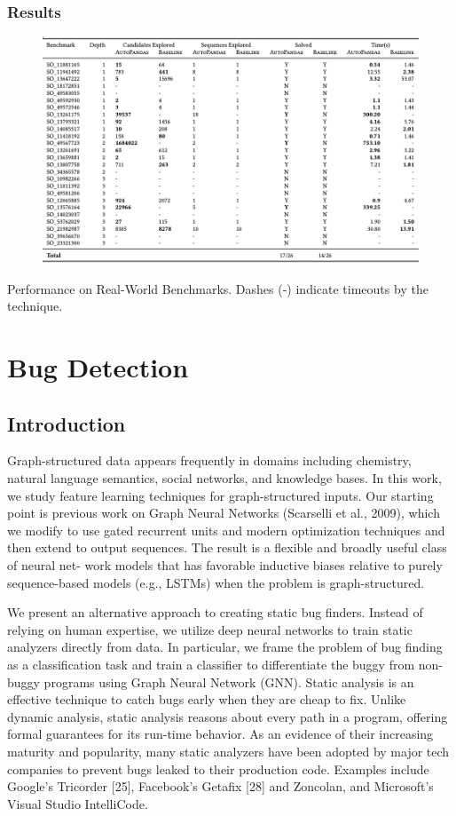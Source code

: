 \documentclass{article}
\begin{document}
\subsubsection{Results}
\begin{figure}[ht]
\vskip 0.2in
\begin{center}
\centerline{\includegraphics[width=\columnwidth]{Images/Synthesis3-3.png}}
\label{icml-historical}
\end{center}
\vskip -0.2in
\end{figure}
Performance on Real-World Benchmarks. Dashes (-) indicate timeouts by the technique.

\section{Bug Detection}
\subsection{Introduction}
Graph-structured data appears frequently in domains including chemistry, natural language semantics, social networks, and knowledge bases. In this work, we study feature learning techniques for graph-structured inputs. Our starting point is previous work on Graph Neural Networks (Scarselli et al., 2009), which we modify to use gated recurrent units and modern optimization techniques and then extend to output sequences. The result is a flexible and broadly useful class of neural net- work models that has favorable inductive biases relative to purely sequence-based models (e.g., LSTMs) when the problem is graph-structured.

We present an alternative approach to creating static bug finders. Instead of relying on human expertise, we utilize deep neural networks to train static analyzers directly from data. In particular, we frame the problem of bug finding as a classification task and train a classifier to differentiate the buggy from non-buggy programs using Graph Neural Network (GNN). Static analysis is an effective technique to catch bugs early when they are cheap to fix. Unlike dynamic analysis, static analysis reasons about every path in a program, offering formal guarantees for its run-time behavior. As an evidence of their increasing maturity and popularity, many static analyzers have been adopted by major tech companies to prevent bugs leaked to their production code. Examples include Google’s Tricorder [25], Facebook’s Getafix [28] and Zoncolan, and Microsoft’s Visual Studio IntelliCode.
\end{document}
